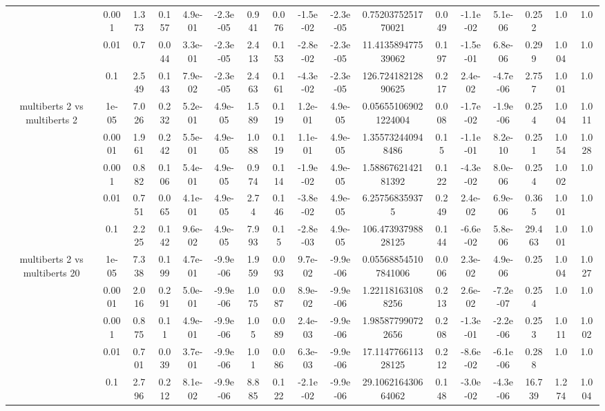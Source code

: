 \begin{tabular}{|c|c|c|c|c|c|c|c|c|c|c|c|c|c|c|c|c|}
 & 0.001 & 1.373 & 0.157 & 4.9e-01 & -2.3e-05 & 0.941 & 0.076 & -1.5e-02 & -2.3e-05 & 0.7520375251770021 & 0.049 & -1.1e-02 & 5.1e-06 & 0.252 & 1.0 & 1.0 \\
 & 0.01 & 0.7 & 0.044 & 3.3e-01 & -2.3e-05 & 2.413 & 0.153 & -2.8e-02 & -2.3e-05 & 11.413589477539062 & 0.197 & -1.5e-01 & 6.8e-06 & 0.299 & 1.004 & 1.0 \\
 & 0.1 & 2.549 & 0.143 & 7.9e-02 & -2.3e-05 & 2.463 & 0.161 & -4.3e-02 & -2.3e-05 & 126.72418212890625 & 0.217 & 2.4e-02 & -4.7e-06 & 2.757 & 1.001 & 1.0 \\
\hline
\multirow{5}{*}{multiberts 2 vs multiberts 2} & 1e-05 & 7.026 & 0.232 & 5.2e-01 & 4.9e-05 & 1.589 & 0.119 & 1.2e-01 & 4.9e-05 & 0.056551069021224004 & 0.008 & -1.7e-02 & -1.9e-06 & 0.254 & 1.004 & 1.011 \\
 & 0.0001 & 1.961 & 0.242 & 5.5e-01 & 4.9e-05 & 1.088 & 0.119 & 1.1e-01 & 4.9e-05 & 1.355732440948486 & 0.15 & -1.1e-01 & 8.2e-10 & 0.251 & 1.054 & 1.028 \\
 & 0.001 & 0.882 & 0.106 & 5.4e-01 & 4.9e-05 & 0.974 & 0.114 & -1.9e-02 & 4.9e-05 & 1.5886762142181392 & 0.122 & -4.3e-02 & 8.0e-06 & 0.254 & 1.002 & 1.0 \\
 & 0.01 & 0.751 & 0.065 & 4.1e-01 & 4.9e-05 & 2.74 & 0.146 & -3.8e-02 & 4.9e-05 & 6.257568359375 & 0.249 & 2.4e-02 & 6.9e-06 & 0.365 & 1.001 & 1.0 \\
 & 0.1 & 2.225 & 0.142 & 9.6e-02 & 4.9e-05 & 7.993 & 0.15 & -2.8e-03 & 4.9e-05 & 106.47393798828125 & 0.144 & -6.6e-02 & 5.8e-06 & 29.463 & 1.001 & 1.0 \\
\hline
\multirow{5}{*}{multiberts 2 vs multiberts 20} & 1e-05 & 7.338 & 0.199 & 4.7e-01 & -9.9e-06 & 1.959 & 0.093 & 9.7e-02 & -9.9e-06 & 0.055688545107841006 & 0.006 & 2.3e-02 & 4.9e-06 & 0.25 & 1.004 & 1.027 \\
 & 0.0001 & 2.016 & 0.291 & 5.0e-01 & -9.9e-06 & 1.075 & 0.087 & 8.9e-02 & -9.9e-06 & 1.221181631088256 & 0.213 & 2.6e-02 & -7.2e-07 & 0.254 & 1.0 & 1.0 \\
 & 0.001 & 0.875 & 0.11 & 4.9e-01 & -9.9e-06 & 1.05 & 0.089 & 2.4e-03 & -9.9e-06 & 1.985877990722656 & 0.208 & -1.3e-01 & -2.2e-06 & 0.253 & 1.011 & 1.002 \\
 & 0.01 & 0.701 & 0.039 & 3.7e-01 & -9.9e-06 & 1.01 & 0.086 & 6.3e-03 & -9.9e-06 & 17.114776611328125 & 0.212 & -8.6e-02 & -6.1e-06 & 0.288 & 1.0 & 1.0 \\
 & 0.1 & 2.796 & 0.212 & 8.1e-02 & -9.9e-06 & 8.885 & 0.122 & -2.1e-02 & -9.9e-06 & 29.106216430664062 & 0.148 & -3.0e-02 & -4.3e-06 & 16.739 & 1.274 & 1.004 \\

\end{tabular}
